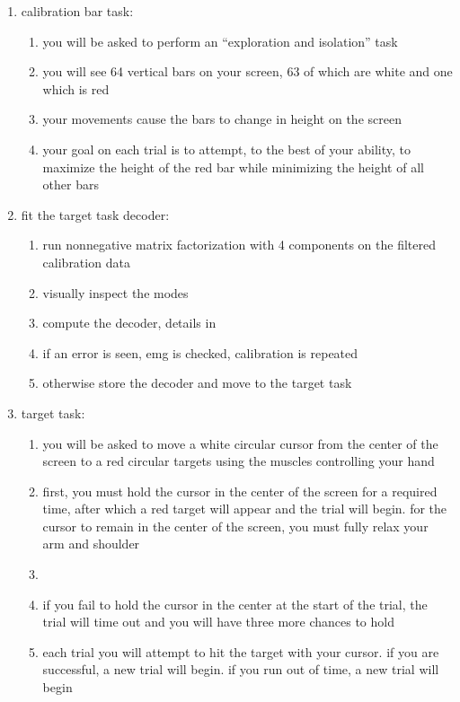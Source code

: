 \documentclass[../main.tex]{subfiles}
\begin{document}
\begin{enumerate}
\begin{enumerate}
  \end{enumerate}
  \item calibration bar task:
  \begin{enumerate}
    \item you will be asked to perform an ``exploration and isolation'' task
    \item you will see 64 vertical bars on your screen, 63 of which are white and one which is red
    \item your movements cause the bars to change in height on the screen
    \item your goal on each trial is to attempt, to the best of your ability, to maximize the height of the red bar while minimizing the height of all other bars
  \end{enumerate}
  \item fit the target task decoder:
  \begin{enumerate}
    \item run nonnegative matrix factorization with 4 components on the filtered calibration data
    \item visually inspect the modes
    \item compute the decoder, details in 
    \item if an error is seen, emg is checked, calibration is repeated
    \item otherwise store the decoder and move to the target task
  \end{enumerate}
  \item target task:
  \begin{enumerate}
    \item you will be asked to move a white circular cursor from the center of the screen to a red circular targets using the muscles controlling your hand
    \item first, you must hold the cursor in the center of the screen for a required time, after which a red target will appear and the trial will begin. for the cursor to remain in the center of the screen, you must fully relax your arm and shoulder
    \item {}\rbrack
    \item if you fail to hold the cursor in the center at the start of the trial, the trial will time out and you will have three more chances to hold
    \item each trial you will attempt to hit the target with your cursor. if you are successful, a new trial will begin. if you run out of time, a new trial will begin

\end{enumerate}
\end{enumerate}
\end{document}
